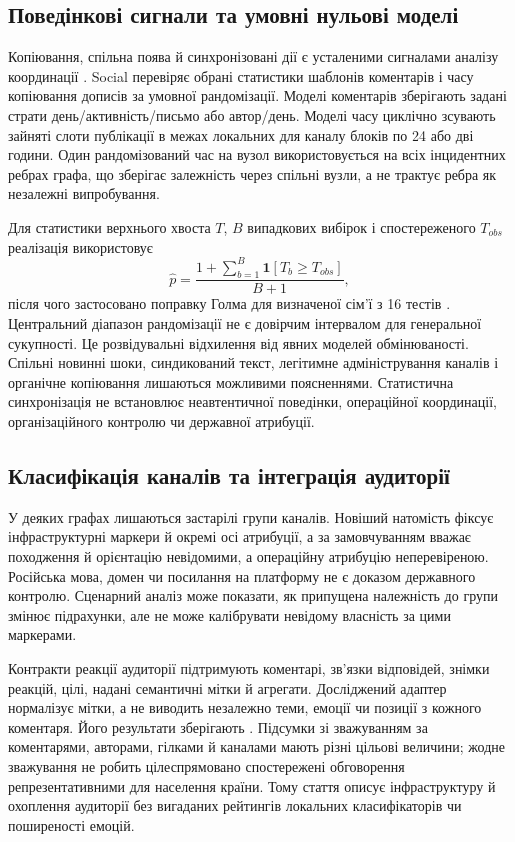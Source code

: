 \subsection{Поведінкові сигнали та умовні нульові моделі}
Копіювання, спільна поява й синхронізовані дії є усталеними сигналами аналізу координації \citep{Pacheco2021,Nizzoli2021,Magelinski2022}. Social перевіряє обрані статистики шаблонів коментарів і часу копіювання дописів за умовної рандомізації. Моделі коментарів зберігають задані страти день/активність/письмо або автор/день. Моделі часу циклічно зсувають зайняті слоти публікації в межах локальних для каналу блоків по 24 або дві години. Один рандомізований час на вузол використовується на всіх інцидентних ребрах графа, що зберігає залежність через спільні вузли, а не трактує ребра як незалежні випробування.

Для статистики верхнього хвоста $T$, $B$ випадкових вибірок і спостереженого $T_{obs}$ реалізація використовує
\begin{equation}\label{eq:permutation}
\widehat p=\frac{1+\sum_{b=1}^{B}\mathbf{1}[T_b\geq T_{obs}]}{B+1},
\end{equation}
після чого застосовано поправку Голма для визначеної сім'ї з 16 тестів \citep{Phipson2010,Holm1979}. Центральний діапазон рандомізації не є довірчим інтервалом для генеральної сукупності. Це розвідувальні відхилення від явних моделей обмінюваності. Спільні новинні шоки, синдикований текст, легітимне адміністрування каналів і органічне копіювання лишаються можливими поясненнями. Статистична синхронізація не встановлює неавтентичної поведінки, операційної координації, організаційного контролю чи державної атрибуції.

\subsection{Класифікація каналів та інтеграція аудиторії}
У деяких графах лишаються застарілі групи каналів. Новіший  натомість фіксує інфраструктурні маркери й окремі осі атрибуції, а за замовчуванням вважає походження й орієнтацію невідомими, а операційну атрибуцію неперевіреною. Російська мова, домен чи посилання на платформу не є доказом державного контролю. Сценарний аналіз може показати, як припущена належність до групи змінює підрахунки, але не може калібрувати невідому власність за цими маркерами.

Контракти реакції аудиторії підтримують коментарі, зв'язки відповідей, знімки реакцій, цілі, надані семантичні мітки й агрегати. Досліджений адаптер нормалізує мітки, а не виводить незалежно теми, емоції чи позиції з кожного коментаря. Його результати зберігають . Підсумки зі зважуванням за коментарями, авторами, гілками й каналами мають різні цільові величини; жодне зважування не робить цілеспрямовано спостережені обговорення репрезентативними для населення країни. Тому стаття описує інфраструктуру й охоплення аудиторії без вигаданих рейтингів локальних класифікаторів чи поширеності емоцій.
